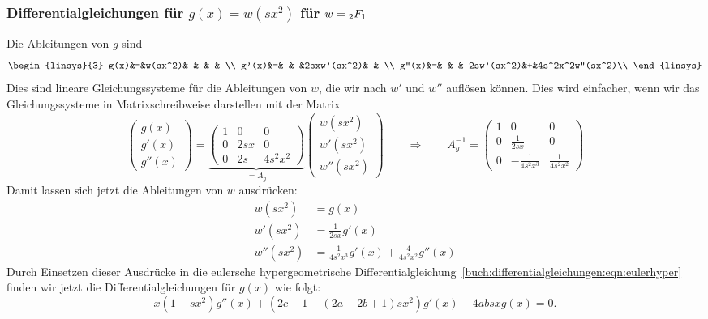 \subsubsection{Differentialgleichungen für $g(x)=w(sx^2)$ für $w=\mathstrut_2F_1$}
Die Ableitungen von $g$ sind
\[
\begin{linsys}{3}
  g(x)&=&w(sx^2)& &           & &                \\
 g'(x)&=&       & &2sxw'(sx^2)& &                \\
g''(x)&=&       & & 2sw'(sx^2)&+&4s^2x^2w''(sx^2)\\
\end{linsys}
\]
Dies sind lineare Gleichungssysteme für die Ableitungen
von $w$, die wir nach $w'$ und $w''$ auflösen können.
Dies wird einfacher, wenn wir das Gleichungssysteme in
Matrixschreibweise darstellen mit der Matrix
\begin{equation*}
\begin{pmatrix}
  g(x)\\
 g'(x)\\
g''(x)
\end{pmatrix}
=
\underbrace{
\begin{pmatrix}
1&   0&       0\\
0& 2sx&       0\\
0&  2s& 4s^2x^2
\end{pmatrix}
}_{\displaystyle = A_g}
\begin{pmatrix}
w(sx^2)\\
w'(sx^2)\\
w''(sx^2)
\end{pmatrix}
\qquad\Rightarrow\qquad
A_g^{-1}
=
\begin{pmatrix}
1&            0       &               0  \\
0&  \frac{1}{2sx}     &               0  \\
0& -\frac{1}{4s^2x^3} & \frac{1}{4s^2x^2}
\end{pmatrix}
\end{equation*}
Damit lassen sich jetzt die Ableitungen von $w$ ausdrücken:
\begin{align*}
  w(sx^2) &= g(x) \\
 w'(sx^2) &= \frac{1}{2sx} g'(x) \\
w''(sx^2) &= \frac{1}{4s^2x^3}g'(x) + \frac{4}{4s^2x^2} g''(x) 
\end{align*}
Durch Einsetzen dieser Ausdrücke in die eulersche hypergeometrische
Differentialgleichung~\eqref{buch:differentialgleichungen:eqn:eulerhyper}
finden wir jetzt die Differentialgleichungen für $g(x)$ 
wie folgt:
\begin{equation}
x(1-sx^2)g''(x)
+
(2c-1-(2a+2b+1)sx^2) g'(x)
-4absx g(x)
=
0.
\label{buch:differential:hypergeometrisch:geradedgl}
\end{equation}


